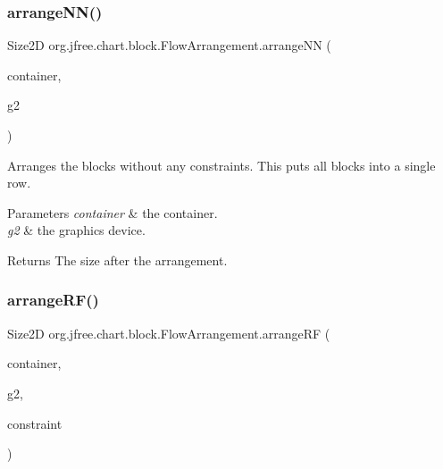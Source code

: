 \subsubsection{\texorpdfstring{arrange\+N\+N()}{arrangeNN()}}
{\footnotesize\ttfamily Size2D org.\+jfree.\+chart.\+block.\+Flow\+Arrangement.\+arrange\+NN (\begin{DoxyParamCaption}\item[{\mbox{\hyperlink{classorg_1_1jfree_1_1chart_1_1block_1_1_block_container}{Block\+Container}}}]{container,  }\item[{Graphics2D}]{g2 }\end{DoxyParamCaption})\hspace{0.3cm}{\ttfamily [protected]}}

Arranges the blocks without any constraints. This puts all blocks into a single row.


\begin{DoxyParams}{Parameters}
{\em container} & the container. \\
\hline
{\em g2} & the graphics device.\\
\hline
\end{DoxyParams}
\begin{DoxyReturn}{Returns}
The size after the arrangement. 
\end{DoxyReturn}
\mbox{\label{classorg_1_1jfree_1_1chart_1_1block_1_1_flow_arrangement_a641846f958e628a7600898efc1d48317}} 
\subsubsection{\texorpdfstring{arrange\+R\+F()}{arrangeRF()}}
{\footnotesize\ttfamily Size2D org.\+jfree.\+chart.\+block.\+Flow\+Arrangement.\+arrange\+RF (\begin{DoxyParamCaption}\item[{\mbox{\hyperlink{classorg_1_1jfree_1_1chart_1_1block_1_1_block_container}{Block\+Container}}}]{container,  }\item[{Graphics2D}]{g2,  }\item[{\mbox{\hyperlink{classorg_1_1jfree_1_1chart_1_1block_1_1_rectangle_constraint}{Rectangle\+Constraint}}}]{constraint }\end{DoxyParamCaption})\hspace{0.3cm}{\ttfamily [protected]}}

